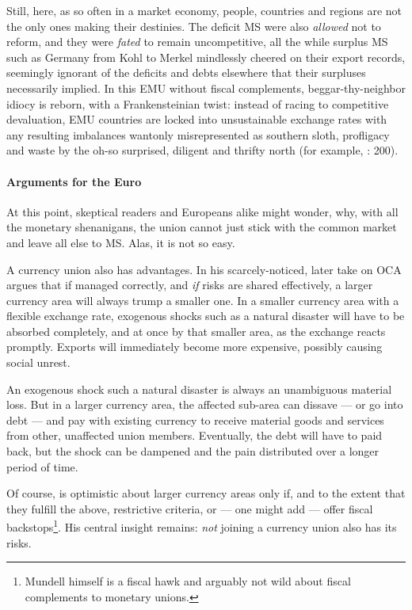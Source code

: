 Still, here, as so often in a market economy, people, countries and regions are not the only ones making their destinies. The deficit \gls{MS} were also \emph{allowed} not to reform, and they were \emph{fated} to remain uncompetitive, all the while surplus \gls{MS} such as Germany from Kohl to Merkel mindlessly cheered on their export records, seemingly ignorant of the deficits and debts elsewhere that their surpluses necessarily implied. In this \gls{EMU} without fiscal complements, beggar-thy-neighbor idiocy is reborn, with a Frankensteinian twist: instead of racing to competitive devaluation, \gls{EMU} countries are locked into unsustainable exchange rates with any resulting imbalances wantonly misrepresented as southern sloth, profligacy and waste by the oh-so surprised, diligent and thrifty north (for example, \citealt{Featherstone2011}: 200).


\paragraph{Arguments for the Euro} At this point, skeptical readers and Europeans alike might wonder, why, with all the monetary shenanigans, the union cannot just stick with the common market and leave all else to \gls{MS}. Alas, it is not so easy.

A currency union also has advantages. In his scarcely-noticed, later take on \gls{OCA} \cite{Mundell1972} argues that if managed correctly, and \emph{if} risks are shared effectively, a larger currency area will always trump a smaller one. In a smaller currency area with a flexible exchange rate, exogenous shocks such as a natural disaster will have to be absorbed completely, and at once by that smaller area, as the exchange reacts promptly. Exports will immediately become more expensive, possibly causing social unrest.

An exogenous shock such a natural disaster is always an unambiguous material loss. But in a larger currency area, the affected sub-area can dissave --- or go into debt --- and pay with existing currency to receive material goods and services from other, unaffected union members. Eventually, the debt will have to paid back, but the shock can be dampened and the pain distributed over a longer period of time.

Of course, \cite{Mundell1972} is optimistic about larger currency areas only if, and to the extent that they fulfill the above, restrictive criteria, or --- one might add --- offer fiscal backstops\footnote{
	Mundell himself is a fiscal hawk and arguably not wild about fiscal complements to monetary unions.}.
His central insight remains: \emph{not} joining a currency union also has its risks.


